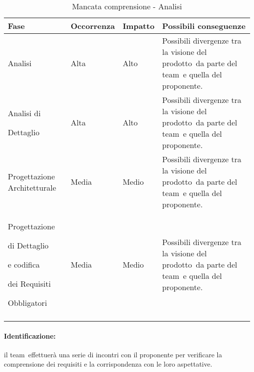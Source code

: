 \documentclass[../PianoProgetto.tex]{subfiles}
\begin{document}
		\begin{longtabu} to \textwidth {X[.55] X[c .50] X[c .50] X}
			\toprule
			\textbf{Fase} & \textbf{Occorrenza} & \textbf{Impatto} & \textbf{Possibili conseguenze}\\
			\midrule
			\endhead
			
			Analisi & Alta & Alto & Possibili divergenze tra la visione del prodotto\g\ da parte del team\g\ e quella del proponente. \\
			\midrule
			Analisi di \par Dettaglio & Alta & Alto & Possibili divergenze tra la visione del prodotto\g\ da parte del team\g\ e quella del proponente.\\
			\midrule
			Progettazione Architetturale & Media & Medio & Possibili divergenze tra la visione del prodotto\g\ da parte del team\g\ e quella del proponente. \\
			\midrule
			Progettazione \par di Dettaglio \par e codifica \par dei Requisiti \par Obbligatori & Media & Medio & Possibili divergenze tra la visione del prodotto\g\ da parte del team\g\ e quella del proponente.\\
			\bottomrule
		
		\caption{Mancata comprensione - Analisi}
		\label{tab:Mancata comprensione - Analisi}	
	\end{longtabu}
		
	\paragraph*{Identificazione:} il team\g\ effettuerà una serie di incontri con il proponente per verificare la comprensione dei requisiti e la corrispondenza con le loro aspettative.
	
\end{document}

